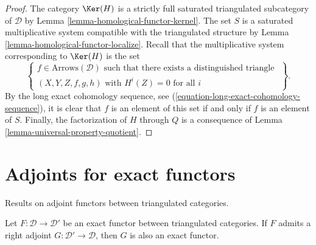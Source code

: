 \begin{proof}
The category $\Ker(H)$ is a strictly full saturated triangulated
subcategory of $\mathcal{D}$ by
Lemma \ref{lemma-homological-functor-kernel}.
The set $S$ is a saturated multiplicative system compatible with the
triangulated structure by
Lemma \ref{lemma-homological-functor-localize}.
Recall that the multiplicative system corresponding to
$\Ker(H)$ is the set
$$
\left\{
\begin{matrix}
f \in \text{Arrows}(\mathcal{D})
\text{ such that there exists a distinguished triangle }\\
(X, Y, Z, f, g, h)\text{ with } H^i(Z) = 0 \text{ for all }i
\end{matrix}
\right\}.
$$
By the long exact cohomology sequence, see
(\ref{equation-long-exact-cohomology-sequence}),
it is clear that $f$ is an element of this set if and only if $f$ is
an element of $S$. Finally, the factorization of $H$ through $Q$ is a
consequence of
Lemma \ref{lemma-universal-property-quotient}.
\end{proof}










\section{Adjoints for exact functors}
\label{section-adjoints}

\noindent
Results on adjoint functors between triangulated categories.

\begin{lemma}
\label{lemma-adjoint-is-exact}
Let $F : \mathcal{D} \to \mathcal{D}'$ be an exact functor between
triangulated categories. If $F$ admits a right adjoint
$G: \mathcal{D'} \to \mathcal{D}$, then $G$ is also an exact functor.
\end{lemma}

